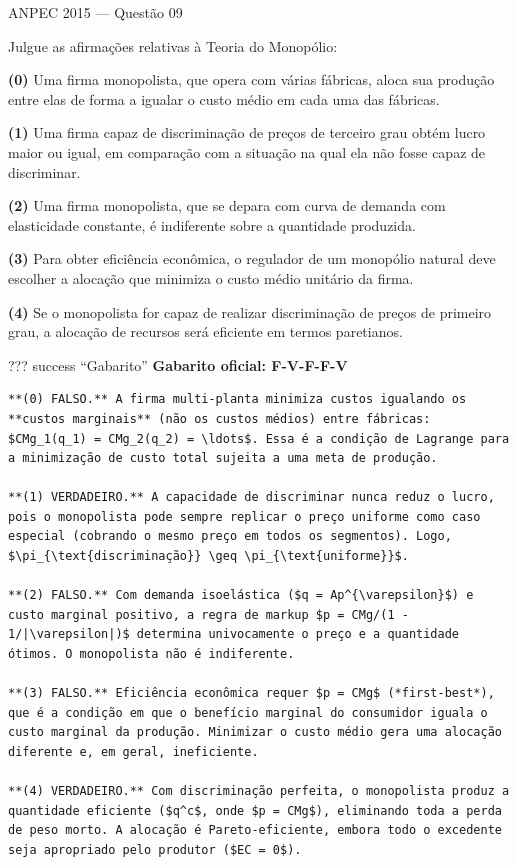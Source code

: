 \documentclass[11pt,twoside,openright]{book}
\begin{document}
\begin{infobox}{ANPEC 2015 — Questão 09}

Julgue as afirmações relativas à Teoria do Monopólio:

\textbf{(0)} Uma firma monopolista, que opera com várias fábricas, aloca
sua produção entre elas de forma a igualar o custo médio em cada uma das
fábricas.

\textbf{(1)} Uma firma capaz de discriminação de preços de terceiro grau
obtém lucro maior ou igual, em comparação com a situação na qual ela não
fosse capaz de discriminar.

\textbf{(2)} Uma firma monopolista, que se depara com curva de demanda
com elasticidade constante, é indiferente sobre a quantidade produzida.

\textbf{(3)} Para obter eficiência econômica, o regulador de um
monopólio natural deve escolher a alocação que minimiza o custo médio
unitário da firma.

\textbf{(4)} Se o monopolista for capaz de realizar discriminação de
preços de primeiro grau, a alocação de recursos será eficiente em termos
paretianos.

??? success ``Gabarito'' \textbf{Gabarito oficial: F-V-F-F-V}

\begin{verbatim}
**(0) FALSO.** A firma multi-planta minimiza custos igualando os **custos marginais** (não os custos médios) entre fábricas: $CMg_1(q_1) = CMg_2(q_2) = \ldots$. Essa é a condição de Lagrange para a minimização de custo total sujeita a uma meta de produção.

**(1) VERDADEIRO.** A capacidade de discriminar nunca reduz o lucro, pois o monopolista pode sempre replicar o preço uniforme como caso especial (cobrando o mesmo preço em todos os segmentos). Logo, $\pi_{\text{discriminação}} \geq \pi_{\text{uniforme}}$.

**(2) FALSO.** Com demanda isoelástica ($q = Ap^{\varepsilon}$) e custo marginal positivo, a regra de markup $p = CMg/(1 - 1/|\varepsilon|)$ determina univocamente o preço e a quantidade ótimos. O monopolista não é indiferente.

**(3) FALSO.** Eficiência econômica requer $p = CMg$ (*first-best*), que é a condição em que o benefício marginal do consumidor iguala o custo marginal da produção. Minimizar o custo médio gera uma alocação diferente e, em geral, ineficiente.

**(4) VERDADEIRO.** Com discriminação perfeita, o monopolista produz a quantidade eficiente ($q^c$, onde $p = CMg$), eliminando toda a perda de peso morto. A alocação é Pareto-eficiente, embora todo o excedente seja apropriado pelo produtor ($EC = 0$).
\end{verbatim}

\end{infobox}
\end{document}
